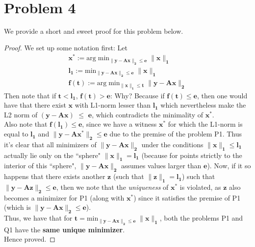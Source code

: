 \documentclass[a4paper,11pt]{article}
\numberwithin{definition}{section}
\numberwithin{mytheorem}{subsection}
\begin{document}
\section{Problem 4}
We provide a short and sweet proof for this problem below.
\begin{proof}
We set up some notation first: Let 
\begin{gather*}
    \boldsymbol{x^*} :=  \mathrm{arg\;min}\boldsymbol{_{\lVert y - Ax\rVert_2 \leq e}\;\lVert x\rVert_1} \\
    \boldsymbol{l_1 := } \mathrm{min}\boldsymbol{_{\lVert y - Ax\rVert_2 \leq e}\;\lVert x\rVert_1} \\
    \boldsymbol{f(t) := } \mathrm{arg\;min}\boldsymbol{_{\lVert x\rVert_1 \leq t}\; \lVert y - Ax\rVert_2} 
\end{gather*}
Then note that if $\boldsymbol{t < l_1}$, $\boldsymbol{f(t) > e}$: Why? Because if $\boldsymbol{f(t) \leq e}$, then one would have that there exist $\boldsymbol{x}$ with L1-norm lesser than $\boldsymbol{l_1}$ which nevertheless make the L2 norm of $\boldsymbol{(y - Ax)}$ $\leq$ $\boldsymbol{e}$, which contradicts the minimality of $\boldsymbol{x^*}$.\\
Also note that $\boldsymbol{f(l_1) \leq e}$, since we have a witness $\boldsymbol{x^*}$ for which the L1-norm is equal to $\boldsymbol{l_1}$ and $\boldsymbol{\lVert y - Ax^*\rVert_2 \leq e}$ due to the premise of the problem P1. Thus it's clear that all minimizers of $\boldsymbol{\lVert y - Ax\rVert_2}$ under the conditions $\boldsymbol{\lVert x\rVert_1 \leq l_1}$ actually lie only on the ``sphere" $\boldsymbol{\lVert x\rVert_1 = l_1}$ (because for points strictly to the interior of this ``sphere", $\boldsymbol{\lVert y - Ax\rVert_2}$ assumes values larger than $\boldsymbol{e}$). Now, if it so happens that there exists another $\boldsymbol{z}$ (such that $\boldsymbol{\lVert z\rVert_1 = l_1}$) such that $\boldsymbol{\lVert y - Az\rVert_2 \leq e}$, then we note that the \emph{uniqueness} of $\boldsymbol{x^*}$ is violated, as $\boldsymbol{z}$ also becomes a minimizer for P1 (along with $\boldsymbol{x^*}$) since it satisfies the premise of P1 (which is $\boldsymbol{\lVert y - Ax\rVert_2 \leq e}$).\\
Thus, we have that for $\boldsymbol{t = \mathrm{min}_{\lVert y - Ax\rVert_2 \leq e}\;\lVert x\rVert_1}$, both the problems P1 and Q1 have the \textbf{same unique minimizer}.\\
Hence proved.
\end{proof}
\end{document}
